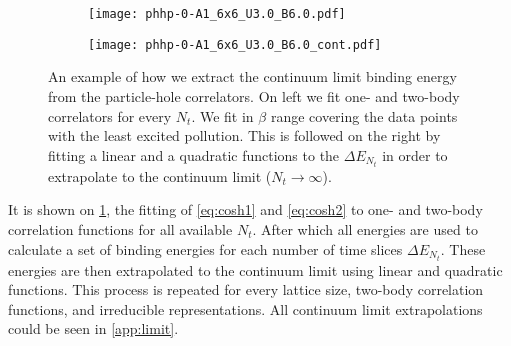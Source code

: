 \begin{figure}[!htbp]
    \begin{subfigure}{.5\textwidth}
      \centering
      \texttt{[image: phhp-0-A1\_6x6\_U3.0\_B6.0.pdf]}
    \end{subfigure}%
    \begin{subfigure}{.5\textwidth}
      \centering
      \texttt{[image: phhp-0-A1\_6x6\_U3.0\_B6.0\_cont.pdf]}
    \end{subfigure}
    \caption{An example of how we extract the continuum limit binding energy from the particle-hole correlators. On left we fit one- and two-body correlators for every $N_t$. We fit in $\beta$ range covering the data points with the least excited pollution. This is followed on the right by fitting a linear and a quadratic functions to the $\Delta E_{N_t}$ in order to extrapolate to the continuum limit ($N_t\to\infty$).}
    \label{fig:cont_lim}
\end{figure}

It is shown on \cref{fig:cont_lim}, the fitting of \cref{eq:cosh1} and \cref{eq:cosh2} to one- and two-body correlation functions for all available $N_t$. After which all energies are used to calculate a set of binding energies for each number of time slices $\Delta E_{N_t}$. These energies are then extrapolated to the continuum limit using linear and quadratic functions. This process is repeated for every lattice size, two-body correlation functions, and irreducible representations. All continuum limit extrapolations could be seen in \cref{app:limit}. 

